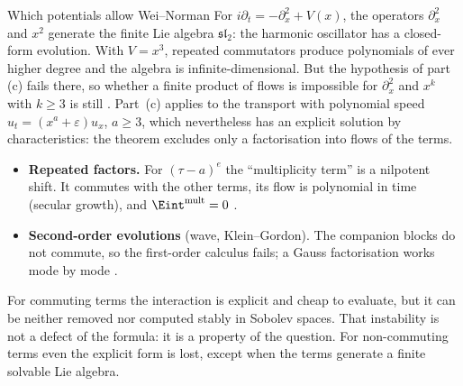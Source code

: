 \begin{example}{Which potentials allow Wei--Norman}
For $i\partial_t=-\partial_x^2+V(x)$, the operators $\partial_x^2$ and $x^2$ generate the finite Lie algebra $\mathfrak{sl}_2$: the harmonic oscillator has a closed-form evolution. With $V=x^3$, repeated commutators produce polynomials of ever higher degree and the algebra is infinite-dimensional. But the hypothesis of part (c) fails there, so whether a finite product of flows is impossible for $\partial_x^2$ and $x^k$ with $k\ge3$ is still \openq{} . Part~(c) applies to the transport with polynomial speed $u_t=(x^a+\varepsilon)u_x$, $a\ge3$, which nevertheless has an explicit solution by characteristics: the theorem excludes only a factorisation into flows of the terms.
\end{example}

\begin{caution}[title={Other ways commutativity is lost}]
\begin{itemize}
\item \textbf{Repeated factors.} For $(\tau-a)^e$ the ``multiplicity term'' is a nilpotent shift. It commutes with the other terms, its flow is polynomial in time (secular growth), and $\Eint^{\mathrm{mult}}=0$  \pw.
\item \textbf{Second-order evolutions} (wave, Klein--Gordon). The companion blocks do not commute, so the first-order calculus fails; a Gauss factorisation works mode by mode  \proved.
\end{itemize}
\end{caution}

\begin{keypoint}
For commuting terms the interaction is explicit and cheap to evaluate, but it can be neither removed nor computed stably in Sobolev spaces. That instability is not a defect of the formula: it is a property of the question. For non-commuting terms even the explicit form is lost, except when the terms generate a finite solvable Lie algebra.
\end{keypoint}
